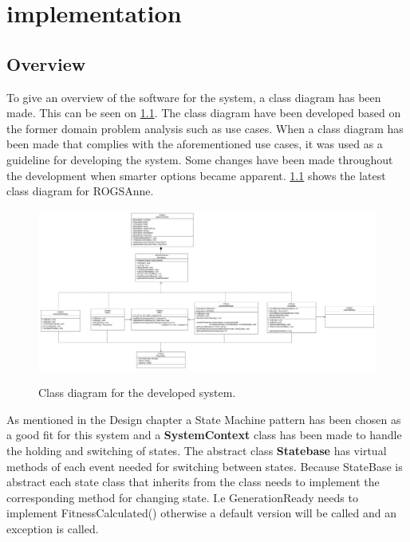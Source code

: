 
\chapter{implementation}

\section{Overview}
To give an overview of the software for the system, a class diagram has been made. This can be seen on \cref{fig:ClassDiagram}.
The class diagram have been developed based on the former domain problem analysis such as use cases. When a class diagram has been made that complies with the aforementioned use cases, it was used as a guideline for developing the system. Some changes have been made throughout the development when smarter options became apparent. \cref{fig:ClassDiagram} shows the latest class diagram for ROGSAnne.

\begin{figure}[H]
	\centering
	{\includegraphics[width=\textwidth]{Images/ClassDiagram.PNG}}\\[0.5cm]
	\caption{Class diagram for the developed system.}
	\label{fig:ClassDiagram}
\end{figure}

As mentioned in the Design chapter a State Machine pattern has been chosen as a good fit for this system and a \textbf{SystemContext} class has been made to handle the holding and switching of states. The abstract class \textbf{Statebase} has virtual methods of each event needed for switching between states. Because StateBase is abstract each state class that inherits from the class needs to implement the corresponding method for changing state. I.e GenerationReady needs to implement FitnessCalculated() otherwise a default version will be called and an exception is called.

